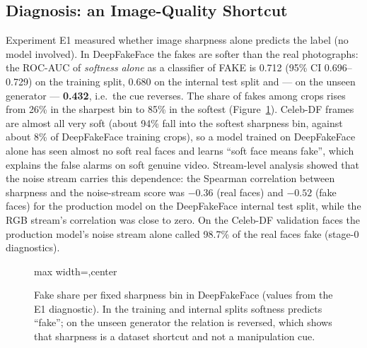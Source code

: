 \subsection{Diagnosis: an Image-Quality Shortcut}
\label{sec:diag}
Experiment E1 measured whether image sharpness alone predicts the label (no model involved). In DeepFakeFace the fakes are softer than the real
photographs: the ROC-AUC of \emph{softness alone} as a classifier of FAKE is 0.712 (95\% CI 0.696--0.729) on the training split, 0.680 on the internal
test split and --- on the unseen generator --- \textbf{0.432}, i.e.\ the cue reverses. The share of fakes among crops rises from 26\% in the sharpest
bin to 85\% in the softest (Figure~\ref{fig:shortcut}). Celeb-DF frames are almost all very soft (about 94\% fall into the softest sharpness bin, against about 8\% of DeepFakeFace training crops), so a model trained on
DeepFakeFace alone has seen almost no soft real faces and learns ``soft face means fake'', which explains the false alarms on soft genuine video.
Stream-level analysis showed that the noise stream carries this dependence: the Spearman correlation between sharpness and the noise-stream score was $-0.36$
(real faces) and $-0.52$ (fake faces) for the production model on the DeepFakeFace internal test split, while the RGB stream's correlation was close to zero. On the
Celeb-DF validation faces the production model's noise stream alone called 98.7\% of the real faces fake (stage-0 diagnostics).

\begin{figure}[ht]
\centering
\begin{adjustbox}{max width=\linewidth,center}
\end{adjustbox}
\caption[Fake share per fixed sharpness bin in DeepFakeFace (values from the E1 diagnostic)]{Fake share per fixed sharpness bin in DeepFakeFace (values from the E1 diagnostic). In the training and internal splits softness predicts
``fake''; on the unseen generator the relation is reversed, which shows that sharpness is a dataset shortcut and not a manipulation cue.}
\label{fig:shortcut}
\end{figure}


